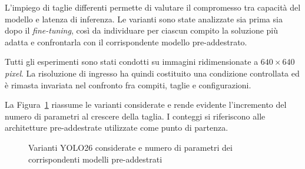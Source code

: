 L'impiego di taglie differenti permette di valutare il compromesso tra capacità del modello e latenza di inferenza. Le varianti sono state analizzate sia prima sia dopo il \textit{fine-tuning}, così da individuare per ciascun compito la soluzione più adatta e confrontarla con il corrispondente modello pre-addestrato.

Tutti gli esperimenti sono stati condotti su immagini ridimensionate a $640\times640$ \textit{pixel}. La risoluzione di ingresso ha quindi costituito una condizione controllata ed è rimasta invariata nel confronto fra compiti, taglie e configurazioni.

La Figura~\ref{fig:yolo26-varianti} riassume le varianti considerate e rende evidente l'incremento del numero di parametri al crescere della taglia. I conteggi si riferiscono alle architetture pre-addestrate utilizzate come punto di partenza.

\begin{figure}[htbp]
    \centering
    \caption[Varianti YOLO26 considerate]{Varianti YOLO26 considerate e numero di parametri dei corrispondenti modelli pre-addestrati}
    \label{fig:yolo26-varianti}
\end{figure}

